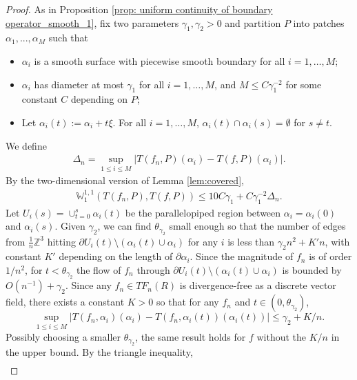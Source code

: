 \documentclass[11pt]{article}
\theoremstyle{remark}
\theoremstyle{definition}
\newcommand{\m}[1]{\mathbb{#1}}
\begin{document}
\begin{proof}
As in Proposition \ref{prop: uniform continuity of boundary operator_smooth_1}, fix two parameters $\gamma_1,\gamma_2>0$ and partition $P$ into patches $\alpha_1,...,\alpha_M$ such that 
\begin{itemize}
    \item $\alpha_i$ is a smooth surface with piecewise smooth boundary for all $i=1,\ldots,M$;
    \item $\alpha_i$ has diameter at most $\gamma_1$ for all $i=1,\ldots,M $, and $M\leq C \gamma_1^{-2}$ for some constant $C$ depending on $P$;
    \item Let $\alpha_i(t):= \alpha_i + t \xi$. For all $i=1,\ldots,M$, $\alpha_i(t)\cap \alpha_i(s) = \emptyset$ for $s\neq t$. 
\end{itemize}
We define 
\begin{align*}
    \Delta_n = \sup_{1\leq i \leq M} \bigg\lvert T(f_n,P)(\alpha_i) - T(f,P)(\alpha_i)\bigg\rvert.
\end{align*}
By the two-dimensional version of Lemma \ref{lem:covered},
\begin{align*}
    \m W_1^{1,1}(T(f_n,P),T(f,P)) \leq 10 C \gamma_1 + C\gamma_1^{-2} \Delta_n.
\end{align*}
Let $U_i(s) = \cup_{t=0}^{s} \alpha_i(t)$ be the parallelopiped region between $\alpha_i=\alpha_i(0)$ and $\alpha_i(s)$. Given $\gamma_2$, we can find $\theta_{\gamma_2}$ small enough so that the number of edges from $\frac{1}{n} \m Z^3$ hitting $\partial U_i(t) \setminus (\alpha_i(t)\cup \alpha_i)$ for any $i$ is less than $\gamma_2 n^2 + K' n$, with constant $K'$ depending on the length of $\partial \alpha_i$. %
Since the magnitude of $f_n$ is of order $1/n^2$, for $t<\theta_{\gamma_2}$ the flow of $f_n$ through $\partial U_i(t) \setminus (\alpha_i(t)\cup \alpha_i)$ is bounded by $O(n^{-1}) + \gamma_2$. Since any $f_n\in TF_n(R)$ is divergence-free as a discrete vector field, there exists a constant $K>0$ so that for any $f_n$ and $t\in (0,\theta_{\gamma_2})$,
\begin{equation}\label{eq: tiling flow div free bound}
    \sup_{1\leq i\leq M} \bigg| T(f_n,\alpha_i)(\alpha_i) - T(f_n,\alpha_i(t))(\alpha_i(t)) \bigg| \leq \gamma_2 + K/n.
\end{equation}
Possibly choosing a smaller $\theta_{\gamma_2}$, the same result holds for $f$ without the $K/n$ in the upper bound. By the triangle inequality,
\begin{align*}

\end{align*}
\end{proof}
\end{document}
